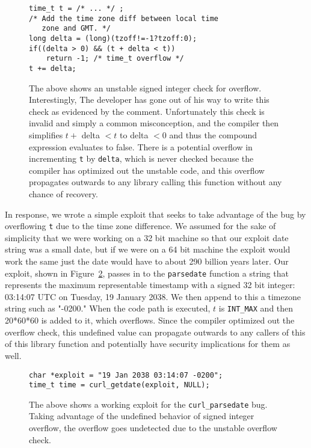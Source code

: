 \documentclass[10pt,twocolumn]{article}
\begin{document}
\begin{figure}[t]
\begin{lstlisting}
time_t t = /* ... */ ;
/* Add the time zone diff between local time
   zone and GMT. */
long delta = (long)(tzoff!=-1?tzoff:0);
if((delta > 0) && (t + delta < t))
    return -1; /* time_t overflow */
t += delta;
\end{lstlisting}
\caption{\label{fig:libcurl1} The above shows an unstable signed integer check
for overflow. Interestingly, The developer has gone out of his way to write
this check as evidenced  by the comment. Unfortunately this check is invalid
and simply a common misconception, and the compiler then simplifies $ t  + $
delta $ < t$ to delta $ < 0$ and thus the compound expression evaluates to
false. There is a potential overflow in incrementing \texttt{t} by
\texttt{delta}, which is never checked because the compiler has optimized out
the unstable code, and this overflow propagates outwards to any library calling
this function without any chance of recovery.}
\end{figure}


In response, we wrote a simple exploit that seeks to take advantage of the bug
by overflowing \texttt{t} due to the time zone difference. We assumed for the
sake of simplicity that we were working on a 32 bit machine so that our exploit
date string was a small date, but if we were on a 64 bit machine the exploit
would work the same just the date would have to about 290 billion years later.
Our exploit, shown in Figure~\ref{fig:curl-xploit}, passes in to the
\texttt{parsedate} function a string that represents the maximum representable
timestamp with a signed 32 bit integer: 03:14:07 UTC on Tuesday, 19 January
2038. We then append to this a timezone string such as "-0200." When the code
path is executed, $t$ is \texttt{INT\_MAX} and then 20*60*60 is added to it,
which overflows. Since the compiler optimized out the overflow check, this
undefined value can propagate outwards to any callers of this of this library
function and potentially have security implications for them as well.

\begin{figure}[t]
\begin{lstlisting}
char *exploit = "19 Jan 2038 03:14:07 -0200";
time_t time = curl_getdate(exploit, NULL);
\end{lstlisting}
\caption{\label{fig:curl-xploit} The above shows a working exploit for the
\texttt{curl\_parsedate} bug. Taking advantage of the undefined behavior of
signed integer overflow, the overflow goes undetected due to the unstable
overflow check.}
\end{figure}
\end{document}

